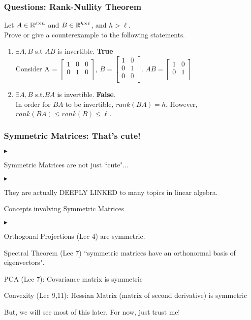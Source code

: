 \documentclass{beamer}
\renewenvironment{itemize}
\renewenvironment{enumerate}%
{\begin{list}{\arabic{enumi}.}%
      {\setlength{\leftmargin}{2.5em}%
       \setlength{\itemsep}{-\parsep}%
       \setlength{\topsep}{-\parskip}%
       \usecounter{enumi}}%
 }{\end{list}}
\renewenvironment{itemize}%
{\begin{list}{$\blacktriangleright$}%
      {\setlength{\leftmargin}{2.5em}%
       \setlength{\itemsep}{-\parsep}%
       \setlength{\topsep}{-\parskip}%
       \usecounter{enumi}}%
 }{\end{list}}
\begin{document}
\begin{frame}
\frametitle{Questions: Rank-Nullity Theorem}
Let $A\in \mathbb{R}^{\ell\times h}$ and $B\in \mathbb{R}^{h\times \ell}$, and $h>\ell$.\\
Prove or give a counterexample to the following statements.
\begin{solution}
\begin{enumerate}
\item $\exists A,B$ s.t $AB$ is invertible.
 \textbf{True}\\
Consider 
A = $\begin{bmatrix}
1 & 0 & 0 \\
0 & 1 & 0 \\
\end{bmatrix}$, $
B = \begin{bmatrix}
1 & 0 \\
0 & 1 \\
0 & 0 \\
\end{bmatrix}$. 
$AB= \begin{bmatrix}
1 & 0 \\
0 & 1 \\
\end{bmatrix}$ 
\medskip
\item $\exists A,B$ s.t.$BA$ is invertible.
\textbf{False}.\\
In order for $BA$ to be invertible, $rank(BA)=h$. However, $rank(BA) \leq rank(B)\leq \ell $.
\end{enumerate}
\end{solution}
\end{frame}


\begin{frame}
\frametitle{Symmetric Matrices: That's cute!}
\begin{itemize}

\item Symmetric Matrices are not just ``cute"...\\
	\begin{itemize}
	\item They are actually DEEPLY LINKED to many topics in linear algebra.\\
	\end{itemize}
\item Concepts involving Symmetric Matrices
\begin{itemize}
\item Orthogonal Projections (Lec 4) are symmetric.\\
\item Spectral Theorem (Lec 7) ``symmetric matrices have an orthonormal basis of eigenvectors".\\
\item PCA (Lec 7): Covariance matrix is symmetric
\item Convexity (Lec 9,11): Hessian Matrix (matrix of second derivative) is symmetric
\end{itemize}
\item But, we will see most of this later. For now, just trust me!
\end{itemize}
\end{frame}
\end{document}
